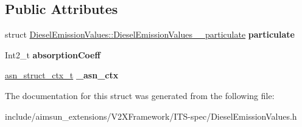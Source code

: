 \subsection*{Public Attributes}
\begin{DoxyCompactItemize}
\item 
struct \hyperlink{structDieselEmissionValues_1_1DieselEmissionValues____particulate}{Diesel\+Emission\+Values\+::\+Diesel\+Emission\+Values\+\_\+\+\_\+particulate} {\bfseries particulate}\hypertarget{structDieselEmissionValues_a56df35e49c95a338780bad7fff8f47e4}{}\label{structDieselEmissionValues_a56df35e49c95a338780bad7fff8f47e4}

\item 
Int2\+\_\+t {\bfseries absorption\+Coeff}\hypertarget{structDieselEmissionValues_a697a62ed8acbaabb47869eb8ee75f888}{}\label{structDieselEmissionValues_a697a62ed8acbaabb47869eb8ee75f888}

\item 
\hyperlink{structasn__struct__ctx__s}{asn\+\_\+struct\+\_\+ctx\+\_\+t} {\bfseries \+\_\+asn\+\_\+ctx}\hypertarget{structDieselEmissionValues_a998d9e50a5534281bbb96ed39042d19e}{}\label{structDieselEmissionValues_a998d9e50a5534281bbb96ed39042d19e}

\end{DoxyCompactItemize}


The documentation for this struct was generated from the following file\+:\begin{DoxyCompactItemize}
\item 
include/aimsun\+\_\+extensions/\+V2\+X\+Framework/\+I\+T\+S-\/spec/Diesel\+Emission\+Values.\+h\end{DoxyCompactItemize}
